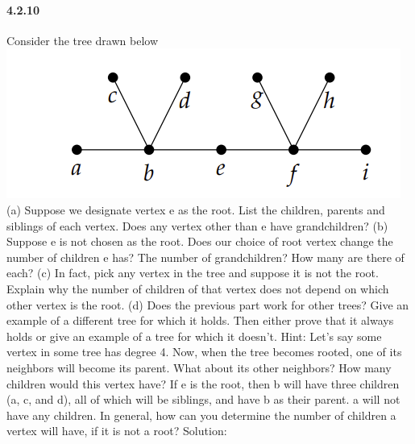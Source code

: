 \documentclass{article}
\begin{document}
 \paragraph{4.2.10}
 Consider the tree drawn below\newline
 \includegraphics{0070}\newline
(a) Suppose we designate vertex e as the root. List the children,
parents and siblings of each vertex. Does any vertex other than
e have grandchildren?\newline
(b) Suppose e is not chosen as the root. Does our choice of root
vertex change the number of children e has? The number of
grandchildren? How many are there of each?\newline
(c) In fact, pick any vertex in the tree and suppose it is not the root.
Explain why the number of children of that vertex does not
depend on which other vertex is the root.\newline
(d) Does the previous part work for other trees? Give an example
of a different tree for which it holds. Then either prove that it
always holds or give an example of a tree for which it doesn’t.\newline
Hint:\newline
Let's say some vertex in some tree has degree 4. Now, when the tree becomes rooted, one of its neighbors will become its parent. What about its other neighbors? How many children would this vertex have?\newline
If e is the root, then b will have three children (a, c, and d), all
of which will be siblings, and have b as their parent. a will not have any
children.\newline
In general, how can you determine the number of children a vertex
will have, if it is not a root?\newline
Solution:\newline
\end{document}
